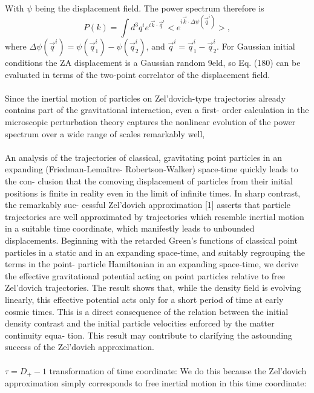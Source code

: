 \begin{description}
With $\psi$ being the displacement field. The power spectrum therefore is
\begin{equation*}
P(k) = \int d^3q^i e^{i \vec{k}\cdot \vec{q}^i}<e^{i \vec{k} \cdot \Delta\psi(\vec{q}^i)}>,
\end{equation*}
where $\Delta\psi(\vec{q}^i)=\psi(\vec{q}^i_1)-\psi(\vec{q}^i_2)$, and $\vec{q}^i = \vec{q}^i_1-\vec{q}^i_2$. For Gaussian initial conditions the ZA displacement
is a Gaussian random 9eld, so Eq. (180) can be evaluated in terms of the two-point correlator of the displacement field.
\\
\\
Since the inertial
motion of particles on Zel’dovich-type trajectories already
contains part of the gravitational interaction, even a first-
order calculation in the microscopic perturbation theory
captures the nonlinear evolution of the power spectrum
over a wide range of scales remarkably well,\\
\\
 An analysis of the trajectories of classical, gravitating
point particles in an expanding (Friedman-Lemaître-
Robertson-Walker) space-time quickly leads to the con-
clusion that the comoving displacement of particles from
their initial positions is finite in reality even in the limit
of infinite times. In sharp contrast, the remarkably suc-
cessful Zel’dovich approximation [1] asserts that particle
trajectories are well approximated by trajectories which
resemble inertial motion in a suitable time coordinate,
which manifestly leads to unbounded displacements. Beginning with the retarded Green’s functions of
classical point particles in a static and in an expanding
space-time, and suitably regrouping the terms in the point-
particle Hamiltonian in an expanding space-time, we derive
the effective gravitational potential acting on point particles
relative to free Zel’dovich trajectories. The result shows
that, while the density field is evolving linearly, this
effective potential acts only for a short period of time at
early cosmic times. This is a direct consequence of the
relation between the initial density contrast and the initial
particle velocities enforced by the matter continuity equa-
tion. This result may contribute to clarifying the astounding
success of the Zel’dovich approximation.\\
\\
$\tau=D_+-1$ transformation of time coordinate: We do this because
the Zel’dovich approximation simply corresponds to free
inertial motion in this time coordinate:
\begin{equation*}

\end{equation*}
\end{description}
